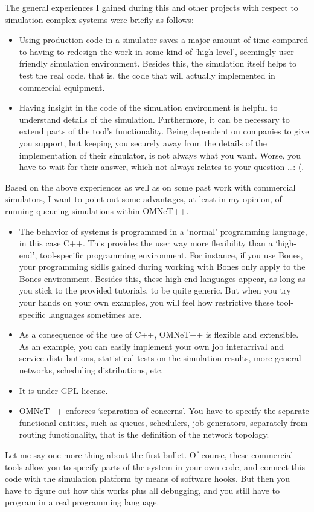 \documentclass[a4paper]{article}
\begin{document}
The general experiences I gained during this and other projects with
respect to simulation complex systems were briefly as follows:
\begin{itemize}
\item Using production code in a simulator saves a major amount of
  time compared to having to redesign the work in some kind of
  `high-level', seemingly user friendly simulation environment.
  Besides this, the simulation itself helps to test the real code,
  that is, the code that will actually implemented in commercial
  equipment.
\item Having insight in the code of the simulation environment is
  helpful to understand details of the simulation. Furthermore, it can
  be necessary to extend parts of the tool's functionality. Being
  dependent on companies to give you support, but keeping you securely
  away from the details of the implementation of their simulator, is
  not always what you want. Worse, you have to wait for their answer,
  which not always relates to your question \ldots :-(.
\end{itemize}
Based on the above experiences as well as on some past work with
commercial simulators, I want to point out some advantages, at least
in my opinion, of running queueing simulations within OMNeT++.
\begin{itemize}
\item The behavior of  systems is programmed in a `normal'
  programming language, in this case C++. This provides the user way
  more flexibility than a `high-end', tool-specific programming
  environment. For instance, if you use Bones, your programming skills
  gained during working with Bones only apply to the Bones
  environment. Besides this, these high-end languages appear, as long
  as you stick to the provided tutorials, to be quite generic. But
  when you try your hands on your own examples,  you will feel how
  restrictive these tool-specific languages sometimes  are.
\item As a consequence of the use of C++, OMNeT++ is flexible and
  extensible. As an example, you can easily implement your own job
  interarrival and service distributions, statistical tests on the
  simulation results, more general networks, scheduling distributions,
  etc.
\item It is under GPL license.
\item OMNeT++ enforces `separation of concerns'. You have to specify
  the separate functional entities, such as queues, schedulers, job
  generators, separately from routing functionality, that is the
  definition of the network topology.
\end{itemize}
Let me say one more thing about the first bullet. Of course, these
commercial tools allow you to specify parts of the system in your own
code, and connect this code with the simulation platform by means of
software hooks.  But then you have to figure out how this works plus
all debugging, and you still have to program in a real programming
language.
\end{document}
